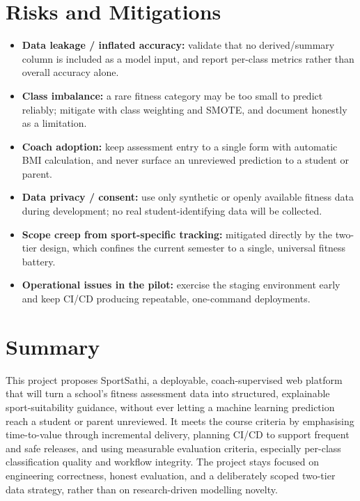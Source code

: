 \documentclass[11pt,a4paper]{article}
\begin{document}
\section{Risks and Mitigations}
\begin{itemize}[leftmargin=0.7cm]
    \item \textbf{Data leakage / inflated accuracy:} validate that no derived/summary column is included as a model input, and report per-class metrics rather than overall accuracy alone.
    \item \textbf{Class imbalance:} a rare fitness category may be too small to predict reliably; mitigate with class weighting and SMOTE, and document honestly as a limitation.
    \item \textbf{Coach adoption:} keep assessment entry to a single form with automatic BMI calculation, and never surface an unreviewed prediction to a student or parent.
    \item \textbf{Data privacy / consent:} use only synthetic or openly available fitness data during development; no real student-identifying data will be collected.
    \item \textbf{Scope creep from sport-specific tracking:} mitigated directly by the two-tier design, which confines the current semester to a single, universal fitness battery.
    \item \textbf{Operational issues in the pilot:} exercise the staging environment early and keep CI/CD producing repeatable, one-command deployments.
\end{itemize}

\section{Summary}
This project proposes SportSathi, a deployable,
coach-supervised web platform that will turn a school's
fitness assessment data into structured, explainable
sport-suitability guidance, without ever letting a machine
learning prediction reach a student or parent unreviewed.
It meets the course criteria by emphasising time-to-value
through incremental delivery, planning CI/CD to support
frequent and safe releases, and using measurable evaluation
criteria, especially per-class classification quality and
workflow integrity. The project stays focused on
engineering correctness, honest evaluation, and a
deliberately scoped two-tier data strategy, rather than on
research-driven modelling novelty.
\end{document}
